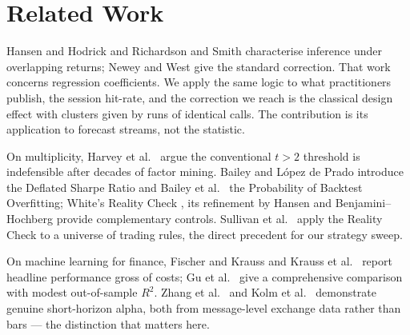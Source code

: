 \documentclass[sigconf,nonacm]{acmart}
\begin{document}
\section{Related Work}

Hansen and Hodrick \cite{hansen1980} and Richardson and Smith
\cite{richardson1991} characterise inference under overlapping returns; Newey
and West \cite{newey1987} give the standard correction. That work concerns
regression coefficients. We apply the same logic to what practitioners publish,
the session hit-rate, and the correction we reach is the classical design effect
\cite{kish1965,moulton1990} with clusters given by runs of identical calls. The
contribution is its application to forecast streams, not the statistic.

On multiplicity, Harvey et al.\ \cite{harvey2016} argue the conventional $t>2$
threshold is indefensible after decades of factor mining. Bailey and López de
Prado \cite{bailey2014} introduce the Deflated Sharpe Ratio and Bailey et al.\
\cite{bailey2017} the Probability of Backtest Overfitting; White's Reality Check
\cite{white2000}, its refinement by Hansen \cite{hansen2005} and
Benjamini--Hochberg \cite{bh1995} provide complementary controls. Sullivan et
al.\ \cite{sullivan1999} apply the Reality Check to a universe of trading rules,
the direct precedent for our strategy sweep.

On machine learning for finance, Fischer and Krauss \cite{fischer2018} and
Krauss et al.\ \cite{krauss2017} report headline performance gross of costs; Gu
et al.\ \cite{gu2020} give a comprehensive comparison with modest out-of-sample
$R^2$. Zhang et al.\ \cite{zhang2019} and Kolm et al.\ \cite{kolm2023}
demonstrate genuine short-horizon alpha, both from message-level exchange data
rather than bars --- the distinction that matters here.
\end{document}
